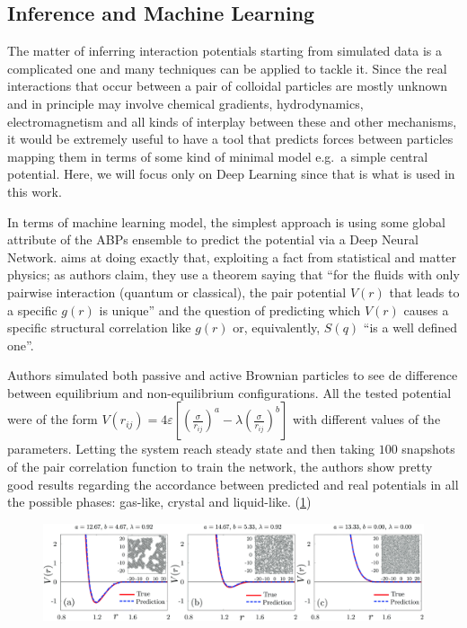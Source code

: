 \documentclass[../../master_thesis_np.tex]{subfiles}
\begin{document}
	\subsection{Inference and Machine Learning}
	The matter of inferring interaction potentials starting from simulated data is a complicated one and many techniques can be applied to tackle it. Since the real interactions that occur between a pair of colloidal particles are mostly unknown and in principle may involve chemical gradients, hydrodynamics, electromagnetism and all kinds of interplay between these and other mechanisms, it would be extremely useful to have a tool that predicts forces between particles mapping them in terms of some kind of minimal model e.g.\ a simple central potential. Here, we will focus only on Deep Learning since that is what is used in this work. 
	
	In terms of machine learning model, the simplest approach is using some global attribute of the ABPs ensemble to predict the potential via a Deep Neural Network. \cite{bag_interaction_2021} aims at doing exactly that, exploiting a fact from statistical and matter physics; as authors claim, they use a theorem saying that \enquote{for the fluids with only pairwise interaction (quantum or classical), the pair potential $V(r)$ that leads to a specific $g(r)$ is unique} and the question of predicting which $V(r)$ causes a specific structural correlation like $g(r)$ or, equivalently, $S(q)$ \enquote{is a well defined one}. 
	
	Authors simulated both passive and active Brownian particles to see de difference between equilibrium and non-equilibrium configurations. All the tested potential were of the form $V(r_{ij}) = 4\varepsilon \left[ \left( \frac{\sigma}{r_{ij}} \right)^a - \lambda \left( \frac{\sigma}{r_{ij}} \right)^b \right]
	$ with different values of the parameters. Letting the system reach steady state and then taking $100$ snapshots of the pair correlation function to train the network, the authors show pretty good results regarding the accordance between predicted and real potentials in all the possible phases: gas-like, crystal and liquid-like. (\ref{fig:bag1})
	\begin{figure}[htp]
		\centering
		\includegraphics[width=\singfigwidth]{bag1.png}
		\caption{\parencite{bag_interaction_2021}}
		\label{fig:bag1}
	\end{figure}
	
\end{document}
